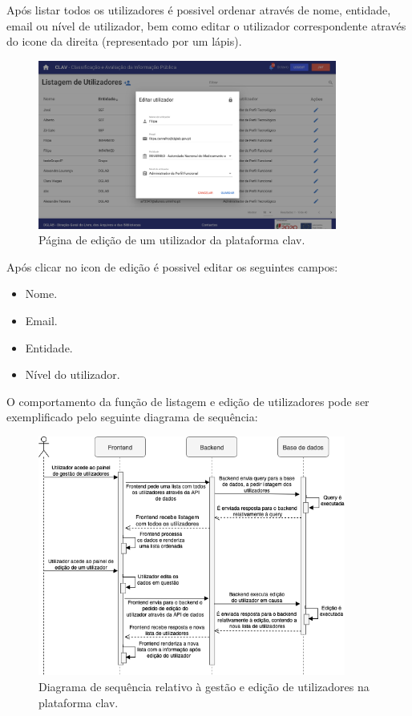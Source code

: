 \vspace{-5mm}
Após listar todos os utilizadores é possivel ordenar através de nome, entidade, email ou nível de utilizador, bem como editar o utilizador correspondente através do icone da direita (representado por um lápis).
\vspace{-3mm}
\begin{figure}[H]
    \centering
    \includegraphics[width=0.875\textwidth]{img/clav/gestao/edicao.png}
    \caption{Página de edição de um utilizador da plataforma \gls{clav}.}
    \label{fig:pagEdicaoUtilizador}
\end{figure}

Após clicar no icon de edição é possivel editar os seguintes campos:

\begin{itemize}
    \item Nome.
    \item Email.
    \item Entidade.
    \item Nível do utilizador.
\end{itemize}

O comportamento da função de listagem e edição de utilizadores pode ser exemplificado pelo seguinte diagrama de sequência:

\begin{figure}[H]
    \centering
    \includegraphics[width=0.9\textwidth]{img/diagramas/sequencia/DiagramasSequencia-GestaoUtilizadores.png}
    \caption{Diagrama de sequência relativo à gestão e edição de utilizadores na plataforma \gls{clav}.}
    \label{fig:diagramaSequenciaGestaoUtilizadores}
\end{figure}

